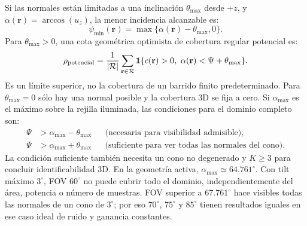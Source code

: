 \documentclass[11pt,a4paper]{article}
\begin{document}
Si las normales están limitadas a una inclinación $\theta_{\max}$ desde $+z$, y $\alpha(\mathbf r)=\arccos(u_z)$, la menor incidencia alcanzable es:
\begin{equation}
\psi_{\min}(\mathbf r)=\max\{\alpha(\mathbf r)-\theta_{\max},0\}.
\end{equation}
Para $\theta_{\max}>0$, una cota geométrica optimista de cobertura regular potencial es:
\begin{equation}
\rho_{\rm potencial}=\frac1{|\mathcal R|}\sum_{\mathbf r\in\mathcal R}
\mathbf1\{c(\mathbf r)>0,\ \alpha(\mathbf r)<\Psi+\theta_{\max}\}.
\end{equation}
Es un límite superior, no la cobertura de un barrido finito predeterminado. Para $\theta_{\max}=0$ sólo hay una normal posible y la cobertura 3D se fija a cero. Si $\alpha_{\max}$ es el máximo sobre la rejilla iluminada, las condiciones para el dominio completo son:
\begin{equation}
\begin{aligned}
\Psi&>\alpha_{\max}-\theta_{\max} &&\text{(necesaria para visibilidad admisible)},\\
\Psi&>\alpha_{\max}+\theta_{\max} &&\text{(suficiente para ver todas las normales del cono)}.
\end{aligned}
\label{eq:FOV_tilt_limits}
\end{equation}
La condición suficiente también necesita un cono no degenerado y $K\geq3$ para concluir identificabilidad 3D. En la geometría activa, $\alpha_{\max}\simeq64.761^\circ$. Con tilt máximo $3^\circ$, FOV $60^\circ$ no puede cubrir todo el dominio, independientemente del área, potencia o número de muestras. FOV superior a $67.761^\circ$ hace visibles todas las normales de un cono de $3^\circ$; por eso $70^\circ$, $75^\circ$ y $85^\circ$ tienen resultados iguales en ese caso ideal de ruido y ganancia constantes.
\end{document}
